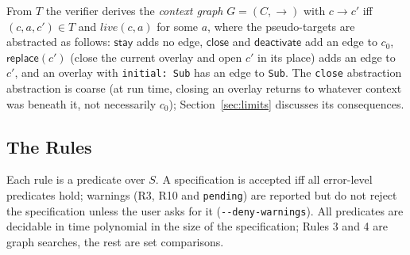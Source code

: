 From $T$ the verifier derives the \emph{context graph}
$G = (C, \to)$ with $c \to c'$ iff $(c, a, c') \in T$ and
$\mathit{live}(c,a)$ for some $a$, where
the pseudo-targets are abstracted as follows: $\mathsf{stay}$ adds no edge,
$\mathsf{close}$ and $\mathsf{deactivate}$ add an edge to $c_0$,
$\mathsf{replace}(c')$ (close the current overlay and open $c'$ in its
place) adds an edge to $c'$, and an
overlay with \texttt{initial: Sub} has an edge to \texttt{Sub}. The
\texttt{close} abstraction
abstraction is coarse (at run time, closing an overlay returns to whatever
context was beneath it, not necessarily $c_0$); Section~\ref{sec:limits}
discusses its consequences.

\subsection{The Rules}
\label{sec:rules}

Each rule is a predicate over $S$. A specification is accepted iff all
error-level predicates hold; warnings (R3, R10 and \texttt{pending}) are
reported but do not reject the specification unless the user asks for it
(\texttt{-{}-deny-warnings}). All predicates are decidable in time
polynomial in the size of the specification; Rules 3 and 4 are graph
searches, the rest are set comparisons.

